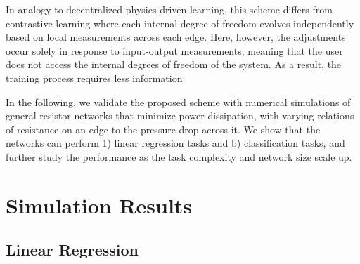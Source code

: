 \documentclass[%
 reprint,
 amsmath,amssymb,
 aps,
]{revtex4-2}
\begin{document}
    In analogy to decentralized physics-driven learning, this scheme differs from contrastive learning \cite{stern2021supervised} where each internal degree of freedom evolves independently based on local measurements across each edge. Here, however, the adjustments occur solely in response to input-output measurements, meaning that the user does not access the internal degrees of freedom of the system. As a result, the training process requires less information. 
   
    In the following, we validate the proposed scheme with numerical simulations of general resistor networks that minimize power dissipation, with varying relations of resistance on an edge to the pressure drop across it. We show that the networks can perform 1) linear regression tasks and b) classification tasks, and further study the performance as the task complexity and network size scale up.

\section{Simulation Results}\label{sec:results}

\subsection{Linear Regression}\label{sec:linear_regression}

    
    
\end{document}
